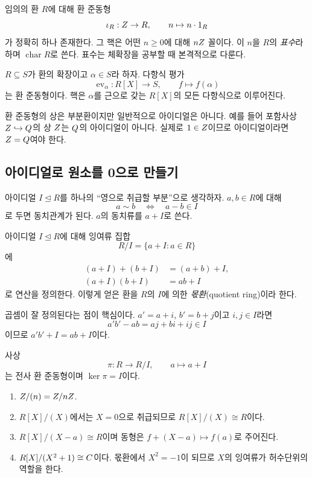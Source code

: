 \begin{example}
임의의 환 $R$에 대해 환 준동형
\[
  \iota_R:Z\to R,\qquad n\mapsto n\cdot1_R
\]
가 정확히 하나 존재한다. 그 핵은 어떤 $n\ge0$에 대해 $nZ$ 꼴이다. 이 $n$을 $R$의 \emph{표수}라 하며 $\operatorname{char}R$로 쓴다. 표수는 체확장을 공부할 때 본격적으로 다룬다.
\end{example}

\begin{example}[평가 준동형]
$R\subseteq S$가 환의 확장이고 $\alpha\in S$라 하자. 다항식 평가
\[
  \operatorname{ev}_\alpha:R[X]\to S,
  \qquad f\mapsto f(\alpha)
\]
는 환 준동형이다. 핵은 $\alpha$를 근으로 갖는 $R[X]$의 모든 다항식으로 이루어진다.
\end{example}

\begin{pitfall}
환 준동형의 상은 부분환이지만 일반적으로 아이디얼은 아니다. 예를 들어 포함사상 $Z\hookrightarrow Q$의 상 $Z$는 $Q$의 아이디얼이 아니다. 실제로 $1\in Z$이므로 아이디얼이라면 $Z=Q$여야 한다.
\end{pitfall}

\subsection{아이디얼로 원소를 0으로 만들기}

아이디얼 $I\trianglelefteq R$를 하나의 ``영으로 취급할 부분''으로 생각하자. $a,b\in R$에 대해
\[
  a\sim b\quad\Longleftrightarrow\quad a-b\in I
\]
로 두면 동치관계가 된다. $a$의 동치류를 $a+I$로 쓴다.

\begin{definition}[몫환]
아이디얼 $I\trianglelefteq R$에 대해 잉여류 집합
\[
  R/I=\{a+I:a\in R\}
\]
에
\[
\begin{aligned}
 (a+I)+(b+I)&=(a+b)+I,\\
 (a+I)(b+I)&=ab+I
\end{aligned}
\]
로 연산을 정의한다. 이렇게 얻은 환을 $R$의 $I$에 의한 \emph{몫환}(quotient ring)이라 한다.
\end{definition}

곱셈이 잘 정의된다는 점이 핵심이다. $a'=a+i$, $b'=b+j$이고 $i,j\in I$라면
\[
  a'b'-ab=aj+bi+ij\in I
\]
이므로 $a'b'+I=ab+I$이다.

\begin{proposition}
사상
\[
  \pi:R\to R/I,\qquad a\mapsto a+I
\]
는 전사 환 준동형이며 $\ker\pi=I$이다.
\end{proposition}

\begin{example}
\begin{enumerate}[label=(\alph*)]
  \item $Z/(n)=Z/nZ$.
  \item $R[X]/(X)$에서는 $X=0$으로 취급되므로 $R[X]/(X)\cong R$이다.
  \item $R[X]/(X-a)\cong R$이며 동형은 $f+(X-a)\mapsto f(a)$로 주어진다.
  \item $R[X]/(X^2+1)\cong C$이다. 몫환에서 $X^2=-1$이 되므로 $X$의 잉여류가 허수단위의 역할을 한다.
\end{enumerate}
\end{example}

